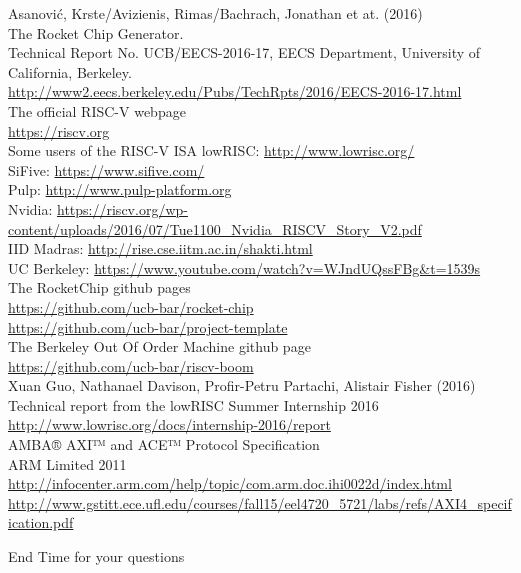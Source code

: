 \documentclass[]{beamer} %
\begin{document}
\tiny
\begin{thebibliography}{9}
		Asanović, Krste/Avizienis, Rimas/Bachrach, Jonathan et at. (2016)\\
		The Rocket Chip Generator.\\
		Technical Report No. UCB/EECS-2016-17, EECS Department, University of California, Berkeley.\\
		\url{http://www2.eecs.berkeley.edu/Pubs/TechRpts/2016/EECS-2016-17.html}\\

		The official RISC-V webpage\\
		\url{https://riscv.org}\\

		Some users of the RISC-V ISA
		lowRISC: \url{http://www.lowrisc.org/}\\
		SiFive: \url{https://www.sifive.com/}\\
		Pulp: \url{http://www.pulp-platform.org}\\
		Nvidia: \url{https://riscv.org/wp-content/uploads/2016/07/Tue1100_Nvidia_RISCV_Story_V2.pdf}\\
		IID Madras: \url{http://rise.cse.iitm.ac.in/shakti.html}\\
		UC Berkeley: \url{https://www.youtube.com/watch?v=WJndUQssFBg&t=1539s}\\

		The RocketChip github pages\\
		\url{https://github.com/ucb-bar/rocket-chip}\\
		\url{https://github.com/ucb-bar/project-template}\\

		The Berkeley Out Of Order Machine github page\\
		\url{https://github.com/ucb-bar/riscv-boom}\\

		Xuan Guo, Nathanael Davison, Profir-Petru Partachi, Alistair Fisher (2016)\\
		Technical report from the lowRISC Summer Internship 2016\\
		\url{http://www.lowrisc.org/docs/internship-2016/report}\\

		AMBA® AXI™ and ACE™ Protocol Specification\\
		ARM Limited 2011\\
		\url{http://infocenter.arm.com/help/topic/com.arm.doc.ihi0022d/index.html}\\
		\url{http://www.gstitt.ece.ufl.edu/courses/fall15/eel4720_5721/labs/refs/AXI4_specification.pdf}\\







\end{thebibliography}


\begin{frame}{\Huge End}
	\huge Time for your questions
\end{frame}
\end{document}
